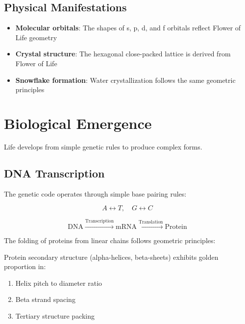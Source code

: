 \subsection{Physical Manifestations}

\begin{itemize}
    \item \textbf{Molecular orbitals}: The shapes of s, p, d, and f orbitals reflect Flower of Life geometry
    \item \textbf{Crystal structure}: The hexagonal close-packed lattice is derived from Flower of Life
    \item \textbf{Snowflake formation}: Water crystallization follows the same geometric principles
\end{itemize}

\section{Biological Emergence}

Life develops from simple genetic rules to produce complex forms.

\subsection{DNA Transcription}

The genetic code operates through simple base pairing rules:

\begin{equation}
A \leftrightarrow T, \quad G \leftrightarrow C
\end{equation}

\begin{equation}
\text{DNA} \xrightarrow{\text{Transcription}} \text{mRNA} \xrightarrow{\text{Translation}} \text{Protein}
\end{equation}

The folding of proteins from linear chains follows geometric principles:

\begin{proposition}
\label{prop:protein-folding}
Protein secondary structure (alpha-helices, beta-sheets) exhibits golden proportion in:
\begin{enumerate}
    \item Helix pitch to diameter ratio
    \item Beta strand spacing
    \item Tertiary structure packing
\end{enumerate}
\end{proposition}

